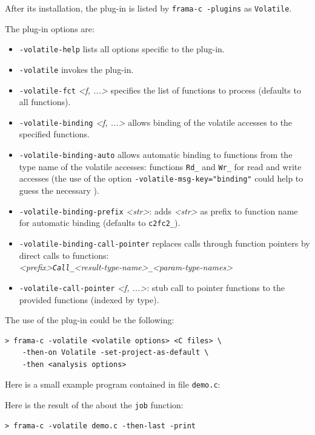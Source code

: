 \documentclass{frama-c-book}
\begin{document}
After its installation, the plug-in is listed by \verb|frama-c -plugins|
as \verb|Volatile|.

The plug-in options are:
\begin{itemize}{}
\item \verb|-volatile-help| lists all options specific to the plug-in.
\item \verb|-volatile| invokes the plug-in.
\item \verb|-volatile-fct| {\sl\/<f, ...>} specifies the list of functions to process (defaults to all functions).
\item \verb|-volatile-binding| {\sl\/<f, ...>} allows binding of the volatile accesses to the specified functions.
\item \verb|-volatile-binding-auto| allows automatic binding to functions from the type name of the volatile accesses: functions \verb|Rd_|{\sl\/<type-name>} and \verb|Wr_|{\sl\/<type-name>} for read and write accesses (the use of the option \verb|-volatile-msg-key="binding"| could help to guess the necessary {\sl <type-name>}).
\item \verb|-volatile-binding-prefix| {\sl <str>}: adds {\sl <str>} as prefix to function name for automatic binding (defaults to \verb|c2fc2_|).
\item \verb|-volatile-binding-call-pointer| replaces calls through function pointers by direct calls to functions:
  \\ {\sl <prefix>\verb|Call_|<result-type-name>\verb|_|<param-type-names>}
\item \verb|-volatile-call-pointer| {\sl <f, ...>}:  stub call to pointer functions to the provided functions (indexed by type).
\end{itemize}

The use of the plug-in could be the following:

\begin{verbatim}
> frama-c -volatile <volatile options> <C files> \
    -then-on Volatile -set-project-as-default \
    -then <analysis options>
\end{verbatim}


Here is a small example \C program contained in file \verb|demo.c|:

Here is the result of the \plugin{} about the \verb|job| function:
\begin{lstlisting}[language=frama-c-commands, style=frama-c-style]
> frama-c -volatile demo.c -then-last -print
\end{lstlisting}
\end{document}
